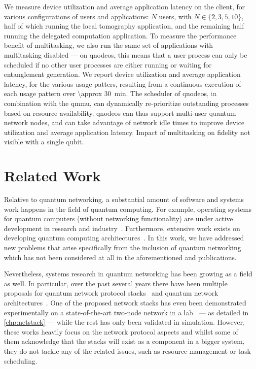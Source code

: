 We measure device utilization and average application latency on the client, for various
configurations of users and applications: $N$ users, with $N \in \{2, 3, 5, 10\}$, half of which
running the local tomography application, and the remaining half running the delegated computation
application. To measure the performance benefit of multitasking, we also run the same set of
applications with multitasking disabled --- on \acrshort{qnodeos}, this means that a user process
can only be scheduled if no other user processes are either running or waiting for entanglement
generation. We report device utilization and average application latency, for the various usage
patters, resulting from a continuous execution of each usage pattern over \qty{\approx 30}{min}.
 The scheduler of \acrshort{qnodeos}, in combination with the
\acrshort{qmmu}, can dynamically re-prioritize outstanding processes based on resource availability.
\acrshort{qnodeos} can thus support multi-user quantum network nodes, and can take advantage of
network idle times to improve device utilization and average application latency. Impact of
multitasking on fidelity not visible with a single qubit.

\section{Related Work}
\label{sec:qnodeos:relwork}

Relative to quantum networking, a substantial amount of software and systems work happens in the
field of quantum computing. For example, operating systems for quantum computers (without networking
functionality) are under active development in research and industry~\cite{kong_2021_origin,
deltaflow_os}. Furthermore, extensive work exists on developing quantum computing
architectures~\cite{fu_2017_microarch, murali_2019_fullstack, bourassa_2021_blueprint}. In this
work, we have addressed new problems that arise specifically from the inclusion of quantum
networking which has not been considered at all in the aforementioned  and
publications.

Nevertheless, systems research in quantum networking has been growing as a field as well. In
particular, over the past several years there have been multiple proposals for quantum network
protocol stacks~\cite{van_meter_2013_repeaters, pirker_2019_quantum, dahlberg_2019_egp,
illiano_2022_quantum} and quantum network architectures~\cite{matsuo_2019_bootstrapping,
aguado_2020_enabling, li_2022_connectionless, diadamo_2022_packet, pouryousef_2022_overlay,
gu_2023_fendi, mandil_2023_packet}. One of the proposed network stacks has even been demonstrated
experimentally on a state-of-the-art two-node network in a lab~\cite{pompili_2022_experimental} ---
as detailed in \cref{chp:netstack} --- while the rest has only been validated in simulation.
However, these works heavily focus on the network protocol aspects and whilst some of them
acknowledge that the stacks will exist as a component in a bigger system, they do not tackle any of
the related issues, such as resource management or task scheduling.

